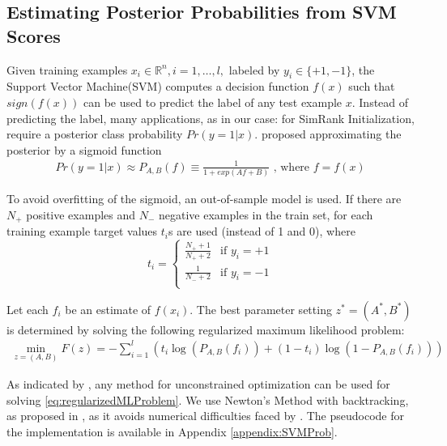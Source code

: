 \subsection{Estimating Posterior Probabilities from SVM Scores}
\label{sec:EstimatingPosteriorProbabilitiesFromSVMScores}
Given training examples $x_i \in \mathbb{R}^n, i=1,\ldots,l,$ labeled by $y_i \in \{+1,-1\}$, the Support Vector Machine(SVM) computes a decision function $f(x)$ such that $sign(f(x))$ can be used to predict the label of any test example $x$.
Instead of predicting the label, many applications, as in our case: for SimRank Initialization, require a posterior class probability $Pr(y=1|x)$. 
\citep{Platt99} proposed approximating the posterior by a sigmoid function
\begin{align}
Pr(y=1|x) \approx P_{A,B}(f) \equiv \frac{1}{1+exp(Af+B)}\mbox{ , where } f=f(x)
\end{align}

To avoid overfitting of the sigmoid, an out-of-sample model is used.
If there are $N_+$ positive examples and $N_-$ negative examples in the train set, for each training example target values $t_i$s are used (instead of 1 and 0), where 
\begin{equation} \label{eq:SVMTargetValues}
t_i =
\left\{ \begin{array}{rl}
\frac{N_+ +1}{N_+ +2} & \mbox{if } y_i = +1\\
\frac{1}{N_- +2} & \mbox{if } y_i = -1\\
\end{array}\right.
\end{equation}

Let each $f_i$ be an estimate of $f(x_i)$. 
The best parameter setting $z^{\ast} = (A^{\ast},B^{\ast})$ is determined by solving the following regularized maximum likelihood problem:
\begin{align} \label{eq:regularizedMLProblem}
\displaystyle \min_{z=(A,B)} F(z) = - \sum_{i=1}^{l}\left( t_i \log(P_{A,B}(f_i)) + (1-t_i)\log(1-P_{A,B}(f_i))\right)
\end{align}

As indicated by \citep{Platt99}, any method for unconstrained optimization can be used for solving \ref{eq:regularizedMLProblem}. We use Newton's Method with backtracking, as proposed in \citep{Lin03Note}, as it avoids numerical difficulties faced by \citep{Platt99}. The pseudocode for the implementation is available in Appendix \ref{appendix:SVMProb}.

